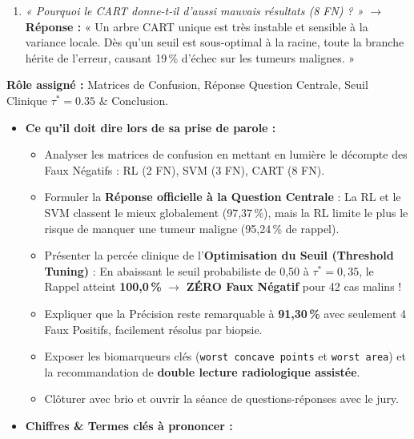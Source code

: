 \documentclass[10pt,a4paper]{article}
\begin{document}
\begin{tcolorbox}[memberbox, title={3. Yassir BOUITA (Master M2SI) -- Slides 6 et 7 (~2 min)}]
\begin{itemize}[leftmargin=0.5cm, itemsep=2pt]
\begin{enumerate}
		\item \textit{« Pourquoi le CART donne-t-il d'aussi mauvais résultats (8 FN) ? »}  
		$\rightarrow$ \textbf{Réponse :} « Un arbre CART unique est très instable et sensible à la variance locale. Dès qu'un seuil est sous-optimal à la racine, toute la branche hérite de l'erreur, causant 19\,\% d'échec sur les tumeurs malignes. »
	\end{enumerate}
\end{itemize}
\end{tcolorbox}

\begin{tcolorbox}[memberbox, title={4. Yasser HAIMED (3A DS-E) -- Slides 8, 9, 10 et 11 (~2 min 30)}]
\textbf{Rôle assigné :} Matrices de Confusion, Réponse Question Centrale, Seuil Clinique $\tau^*=0.35$ \& Conclusion.
\begin{itemize}[leftmargin=0.5cm, itemsep=2pt]
	\item \textbf{Ce qu'il doit dire lors de sa prise de parole :}
	\begin{itemize}
		\item Analyser les matrices de confusion en mettant en lumière le décompte des Faux Négatifs : RL (2 FN), SVM (3 FN), CART (8 FN).
		\item Formuler la \textbf{Réponse officielle à la Question Centrale} : La RL et le SVM classent le mieux globalement (97,37\,\%), mais la RL limite le plus le risque de manquer une tumeur maligne (95,24\,\% de rappel).
		\item Présenter la percée clinique de l'\textbf{Optimisation du Seuil (Threshold Tuning)} :
		En abaissant le seuil probabiliste de 0,50 à \textbf{$\tau^* = 0,35$}, le Rappel atteint \textbf{100,0\,\%} $\rightarrow$ \textbf{ZÉRO Faux Négatif} pour 42 cas malins !
		\item Expliquer que la Précision reste remarquable à \textbf{91,30\,\%} avec seulement 4 Faux Positifs, facilement résolus par biopsie.
		\item Exposer les biomarqueurs clés (\texttt{worst concave points} et \texttt{worst area}) et la recommandation de \textbf{double lecture radiologique assistée}.
		\item Clôturer avec brio et ouvrir la séance de questions-réponses avec le jury.
	\end{itemize}
	\item \textbf{Chiffres \& Termes clés à prononcer :}

\end{itemize}
\end{tcolorbox}
\end{document}

